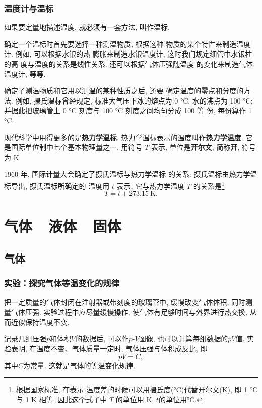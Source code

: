 \documentclass[11pt,a4paper]{ctexbook}
\newcommand{\unit}[1]{\ \mathrm{#1}}
\begin{document}
\subsection{温度计与温标}

如果要定量地描述温度, 就必须有一套方法, 叫作温标.

确定一个温标时首先要选择一种测温物质, 根据这种
物质的某个特性来制造温度计. 例如, 可以根据水银的热
膨胀来制造水银温度计, 这时我们规定细管中水银柱的高
度与温度的关系是线性关系. 还可以根据气体压强随温度
的变化来制造气体温度计, 等等.

确定了测温物质和它用以测温的某种性质之后, 还要
确定温度的零点和分度的方法. 例如, 摄氏温标曾经规定,
标准大气压下冰的熔点为 0 °C, 水的沸点为 100 °C;
并据此把玻璃管上 0 °C 刻度与 100 °C 刻度之间均匀分成 100 等
份, 每份算作 1 °C.

现代科学中用得更多的是\textbf{热力学温标}. 热力学温标表示的温度叫作\textbf{热力学温度},
它是国际单位制中七个基本物理量之一, 用符号 $T$ 表示,
单位是\textbf{开尔文}, 简称\textbf{开}, 符号为 K.

1960 年, 国际计量大会确定了摄氏温标与热力学温标
的关系: 摄氏温标由热力学温标导出, 摄氏温标所确定的
温度用 $t$ 表示, 它与热力学温度 $T$ 的关系是\footnote{根据国家标准, 在表示
温度差的时候可以用摄氏度(°C)代替开尔文(K), 即 1 °C 与 1 K 相等. 因此这个式子中 $T$ 的单位用 K, $t$的单位用°C.}
$$T = t + 273.15\unit{K}.$$

\chapter{气体\ \ 液体\ \ 固体}

\section{气体}



\subsection{实验：探究气体等温变化的规律}

把一定质量的气体封闭在注射器或带刻度的玻璃管中, 缓慢改变气体体积, 同时测量气体压强. 实验过程中应尽量缓慢操作, 使气体有足够时间与外界进行热交换, 从而近似保持温度不变.

记录几组压强$p$和体积$V$的数据后, 可以作$p$-$V$图像, 也可以计算每组数据的$pV$值. 实验表明, 在温度不变、气体质量一定时, 气体压强与体积成反比, 即
$$pV=C,$$
其中$C$为常量. 这就是气体的等温变化规律.
\end{document}
